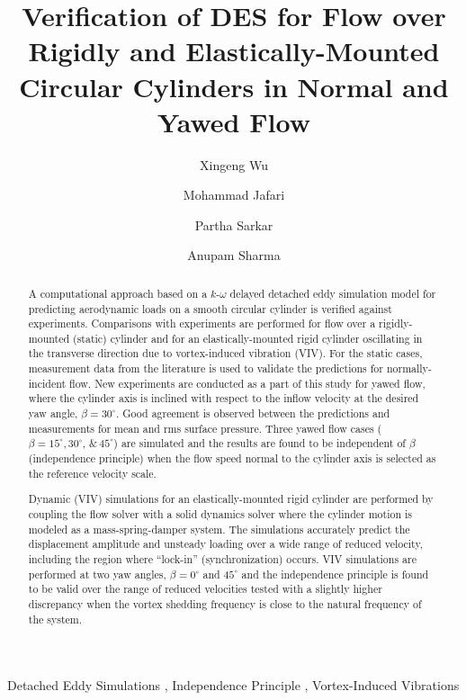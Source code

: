 \documentclass[12pt,authoryear]{elsarticle}
\begin{document}
\begin{frontmatter}

\title{Verification of DES for Flow over Rigidly and Elastically-Mounted
Circular Cylinders in Normal and Yawed Flow}


\author[1]{Xingeng Wu}
\author[1]{Mohammad Jafari} 
\author[2]{Partha Sarkar}
\author[3]{Anupam Sharma}
\address{Department of Aerospace Engineering, Iowa State University, Ames, Iowa, 50011}

\begin{abstract}
A computational approach based on a $k$-$\omega$ delayed detached eddy simulation
model for predicting aerodynamic loads on a smooth circular cylinder is
verified against experiments. Comparisons with experiments are performed for
flow over a rigidly-mounted (static) cylinder and for an elastically-mounted
rigid cylinder oscillating in the transverse direction due to vortex-induced
vibration (VIV). For the static cases, measurement data from the literature is
used to validate the predictions for normally-incident flow.  New experiments
are conducted as a part of this study for yawed flow, where the cylinder axis
is inclined with respect to the inflow velocity at the desired yaw angle,
$\beta=30^\circ$. Good agreement is observed between the predictions and
measurements for mean and rms surface pressure.  Three yawed flow cases
($\beta=15^\circ, 30^\circ, \,\&\, 45^\circ$) are simulated and the results are
found to be independent of $\beta$ (independence principle) when the flow speed
normal to the cylinder axis is selected as the reference velocity scale.

Dynamic (VIV) simulations for an elastically-mounted rigid cylinder are
performed by coupling the flow solver with a solid dynamics solver where the
cylinder motion is modeled as a mass-spring-damper system. The simulations
accurately predict the displacement amplitude and unsteady loading over a wide
range of reduced velocity, including the region where ``lock-in''
(synchronization) occurs. VIV simulations are performed at two yaw angles,
$\beta=0^\circ$ and $45^\circ$ and the independence principle is found to be
valid over the range of reduced velocities tested with a slightly higher
discrepancy when the vortex shedding frequency is close to the natural
frequency of the system.
\end{abstract}

\begin{keyword}
  Detached Eddy Simulations \sep 
  Independence Principle \sep
  Vortex-Induced Vibrations
\end{keyword}
\end{frontmatter}
\end{document}
